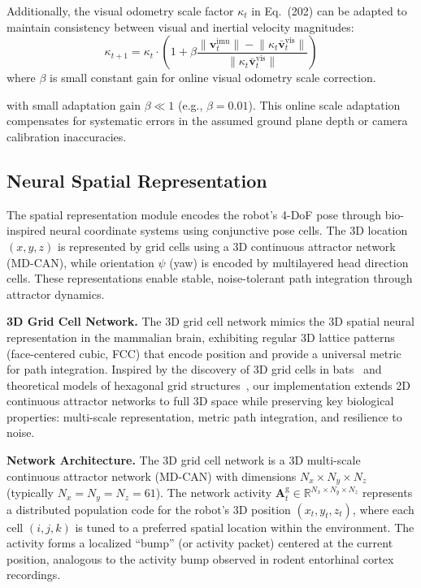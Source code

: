 Additionally, the visual odometry scale factor $\kappa_t$ in Eq.~(202) can be adapted to maintain consistency between visual and inertial velocity magnitudes:
\begin{equation}
    \kappa_{t+1} = \kappa_t \cdot \left(1 + \beta \frac{\lVert\mathbf{v}^\mathrm{imu}_t\rVert - \lVert\kappa_t \bar{\mathbf{v}}^\mathrm{vis}_t\rVert}{\lVert\kappa_t \bar{\mathbf{v}}^\mathrm{vis}_t\rVert}\right)
\end{equation}
where $\beta$ is small constant gain for online visual odometry scale correction.

with small adaptation gain $\beta \ll 1$ (e.g., $\beta=0.01$). This online scale adaptation compensates for systematic errors in the assumed ground plane depth or camera calibration inaccuracies.

\subsection{Neural Spatial Representation}

The spatial representation module encodes the robot's 4-DoF pose through bio-inspired neural coordinate systems using conjunctive pose cells. The 3D location $(x, y, z)$ is represented by grid cells using a 3D continuous attractor network (MD-CAN), while orientation $\psi$ (yaw) is encoded by multilayered head direction cells. These representations enable stable, noise-tolerant path integration through attractor dynamics.

\textbf{3D Grid Cell Network.} The 3D grid cell network mimics the 3D spatial neural representation in the mammalian brain, exhibiting regular 3D lattice patterns (face-centered cubic, FCC) that encode position and provide a universal metric for path integration. Inspired by the discovery of 3D grid cells in bats~\cite{finkelstein2016three} and theoretical models of hexagonal grid structures~\cite{hafting2005microstructure}, our implementation extends 2D continuous attractor networks to full 3D space while preserving key biological properties: multi-scale representation, metric path integration, and resilience to noise.

\textbf{Network Architecture.} The 3D grid cell network is a 3D multi-scale continuous attractor network (MD-CAN) with dimensions $N_x \times N_y \times N_z$ (typically $N_x = N_y = N_z = 61$). The network activity $\mathbf{A}^\mathrm{g}_t \in \mathbb{R}^{N_x \times N_y \times N_z}$ represents a distributed population code for the robot's 3D position $(x_t, y_t, z_t)$, where each cell $(i,j,k)$ is tuned to a preferred spatial location within the environment. The activity forms a localized ``bump'' (or activity packet) centered at the current position, analogous to the activity bump observed in rodent entorhinal cortex recordings.

